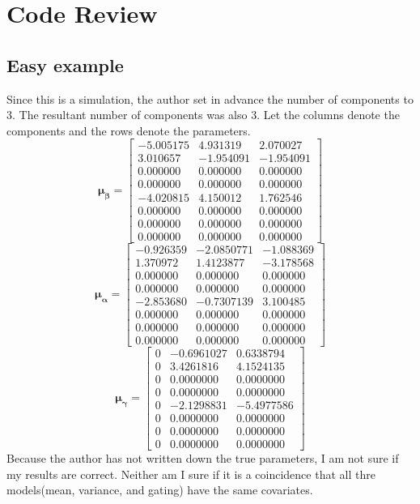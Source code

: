 \documentclass[11pt]{article}
\newcommand{\bs}{\boldsymbol}
\begin{document}
\section{Code Review}
\subsection{Easy example}
Since this is a simulation, the author set in advance the number of components to 3. The resultant number of components was also 3. Let the columns denote the components and the rows denote the parameters.
$$
  \bs{\mu}_{\bs{\beta}} = \begin{bmatrix}
    -5.005175 & 4.931319 & 2.070027 \\
    3.010657 & -1.954091 & -1.954091 \\
    0.000000 & 0.000000 & 0.000000 \\
    0.000000 & 0.000000 & 0.000000 \\
    -4.020815 & 4.150012 & 1.762546 \\
    0.000000 & 0.000000 & 0.000000 \\
    0.000000 & 0.000000 & 0.000000 \\
    0.000000 & 0.000000 & 0.000000
  \end{bmatrix}
$$
$$
  \bs{\mu}_{\bs{\alpha}} = \begin{bmatrix}
    -0.926359 & -2.0850771 & -1.088369\\
    1.370972 & 1.4123877 & -3.178568 \\
    0.000000 & 0.000000 & 0.000000 \\
    0.000000 & 0.000000 & 0.000000\\
    -2.853680 & -0.7307139 & 3.100485\\
    0.000000 & 0.000000 & 0.000000 \\
    0.000000 & 0.000000 & 0.000000\\
    0.000000 & 0.000000 & 0.000000
  \end{bmatrix}
$$
$$
  \bs{\mu}_{\bs{\gamma}} = \begin{bmatrix}
    0 & -0.6961027 & 0.6338794\\
    0 & 3.4261816 & 4.1524135\\
    0 & 0.0000000 & 0.0000000\\
    0 & 0.0000000 & 0.0000000 \\
    0 & -2.1298831 & -5.4977586\\
    0 & 0.0000000 & 0.0000000\\
    0 & 0.0000000 & 0.0000000\\
    0 & 0.0000000 & 0.0000000
  \end{bmatrix}
$$
Because the author has not written down the true parameters, I am not sure if my results are correct. Neither am I sure if it is a coincidence that all thre models(mean, variance, and gating) have the same covariates.
\end{document}
